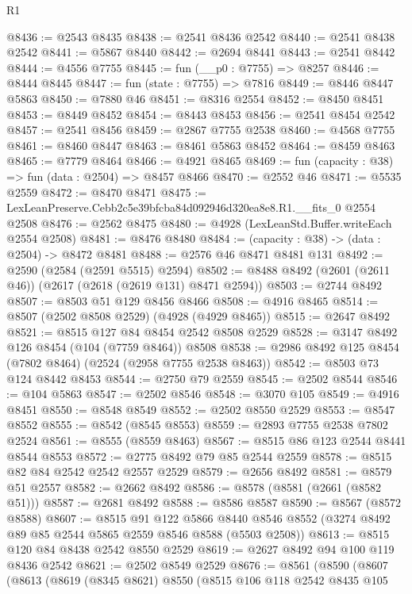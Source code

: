 \begin{lexlean}{R1}
\begin{coremodule}
@8436 := @2543 @8435
@8438 := @2541 @8436 @2542
@8440 := @2541 @8438 @2542
@8441 := @5867 @8440
@8442 := @2694 @8441
@8443 := @2541 @8442
@8444 := @4556 @7755
@8445 := fun (__p0 : @7755) => @8257
@8446 := @8444 @8445
@8447 := fun (state : @7755) => @7816
@8449 := @8446 @8447 @5863
@8450 := @7880 @46
@8451 := @8316 @2554
@8452 := @8450 @8451
@8453 := @8449 @8452
@8454 := @8443 @8453
@8456 := @2541 @8454 @2542
@8457 := @2541 @8456
@8459 := @2867 @7755 @2538
@8460 := @4568 @7755
@8461 := @8460 @8447
@8463 := @8461 @5863 @8452
@8464 := @8459 @8463
@8465 := @7779 @8464
@8466 := @4921 @8465
@8469 := fun (capacity : @38) => fun (data : @2504) => @8457 @8466
@8470 := @2552 @46
@8471 := @5535 @2559
@8472 := @8470 @8471
@8475 := LexLeanPreserve.Cebb2c5e39bfcba84d092946d320ea8e8.R1.__fits_0 @2554 @2508
@8476 := @2562 @8475
@8480 := @4928 (LexLeanStd.Buffer.writeEach @2554 @2508)
@8481 := @8476 @8480
@8484 := (capacity : @38) -> (data : @2504) -> @8472 @8481
@8488 := @2576 @46 @8471 @8481 @131
@8492 := @2590 (@2584 (@2591 @5515) @2594)
@8502 := @8488 @8492 (@2601 (@2611 @46)) (@2617 (@2618 (@2619 @131) @8471 @2594))
@8503 := @2744 @8492
@8507 := @8503 @51 @129 @8456 @8466
@8508 := @4916 @8465
@8514 := @8507 (@2502 @8508 @2529) (@4928 (@4929 @8465))
@8515 := @2647 @8492
@8521 := @8515 @127 @84 @8454 @2542 @8508 @2529
@8528 := @3147 @8492 @126 @8454 (@104 (@7759 @8464)) @8508
@8538 := @2986 @8492 @125 @8454 (@7802 @8464) (@2524 (@2958 @7755 @2538 @8463))
@8542 := @8503 @73 @124 @8442 @8453
@8544 := @2750 @79 @2559
@8545 := @2502 @8544
@8546 := @104 @5863
@8547 := @2502 @8546
@8548 := @3070 @105
@8549 := @4916 @8451
@8550 := @8548 @8549
@8552 := @2502 @8550 @2529
@8553 := @8547 @8552
@8555 := @8542 (@8545 @8553)
@8559 := @2893 @7755 @2538 @7802 @2524
@8561 := @8555 (@8559 @8463)
@8567 := @8515 @86 @123 @2544 @8441 @8544 @8553
@8572 := @2775 @8492 @79 @85 @2544 @2559
@8578 := @8515 @82 @84 @2542 @2542 @2557 @2529
@8579 := @2656 @8492
@8581 := @8579 @51 @2557
@8582 := @2662 @8492
@8586 := @8578 (@8581 (@2661 (@8582 @51)))
@8587 := @2681 @8492
@8588 := @8586 @8587
@8590 := @8567 (@8572 @8588)
@8607 := @8515
    @91
    @122
    @5866
    @8440
    @8546
    @8552
    (@3274 @8492 @89 @85 @2544 @5865 @2559 @8546 @8588 (@5503 @2508))
@8613 := @8515 @120 @84 @8438 @2542 @8550 @2529
@8619 := @2627 @8492 @94 @100 @119 @8436 @2542
@8621 := @2502 @8549 @2529
@8676 := @8561
    (@8590
      (@8607
        (@8613
          (@8619
            (@8345 @8621)
            @8550
            (@8515
              @106
              @118
              @2542
              @8435
              @105

\end{coremodule}
\end{lexlean}
